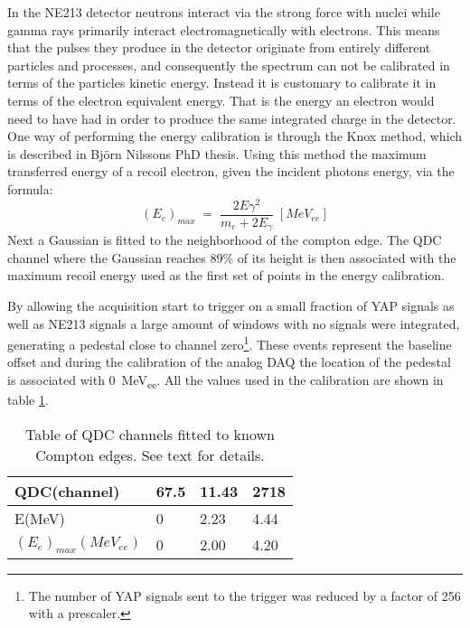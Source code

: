 \documentclass[main.tex]{subfiles}
\begin{document}
In the NE213 detector neutrons interact via the strong force with nuclei while gamma rays primarily interact electromagnetically with electrons. This means that the pulses they produce in the detector originate from entirely different particles and processes, and consequently the spectrum can not be calibrated in terms of the particles kinetic energy. Instead it is customary to calibrate it in terms of the electron equivalent energy. That is the energy an electron would need to have had in order to produce the same integrated charge in the detector. One way of performing the energy calibration is through the Knox method, which is described in Björn Nilssons PhD thesis\cite[pg. 55]{Nilsson}. Using this method the maximum transferred energy of a recoil electron, given the incident photons energy, via the formula:
\begin{equation}
	(E_{e})_{max}\;=\;\frac{2E\gamma^2}{m_e + 2E_\gamma} \;[MeV_{ee}]
\end{equation}
Next a Gaussian is fitted to the neighborhood of the compton edge. The QDC channel where the Gaussian reaches 89\% of its height is then associated with the maximum recoil energy used as the first set of points in the energy calibration.

By allowing the acquisition start to trigger on a small fraction of YAP signals as well as NE213 signals a large amount of windows with no signals were integrated, generating a pedestal close to channel zero\footnote{The number of YAP signals sent to the trigger was reduced by a factor of 256 with a prescaler.}. These events represent the baseline offset and during the calibration of the analog DAQ the location of the pedestal is associated with \SI{0}{MeV_{ee}}. All the values used in the calibration are shown in table \ref{tab:knox_a}.

\begin{table}[hb]
	\center
	\begin{tabular}{|l|l|l|l|}
	\hline
	QDC(channel)             & 67.5 & 11.43 & 2718 \\
	\hline
	E(MeV)          & 0    & 2.23  & 4.44 \\
	\hline
	$(E_{e})_{max}(MeV_{ee})$ & 0    & 2.00  & 4.20 \\
	\hline
	\end{tabular}
   	\captionsetup{width=0.435\linewidth}
	\caption[Table of values used for energy calibration, analog setup.]{Table of QDC channels fitted to known Compton edges. See text for details.}
	\label{tab:knox_a}
\end{table}
\end{document}
